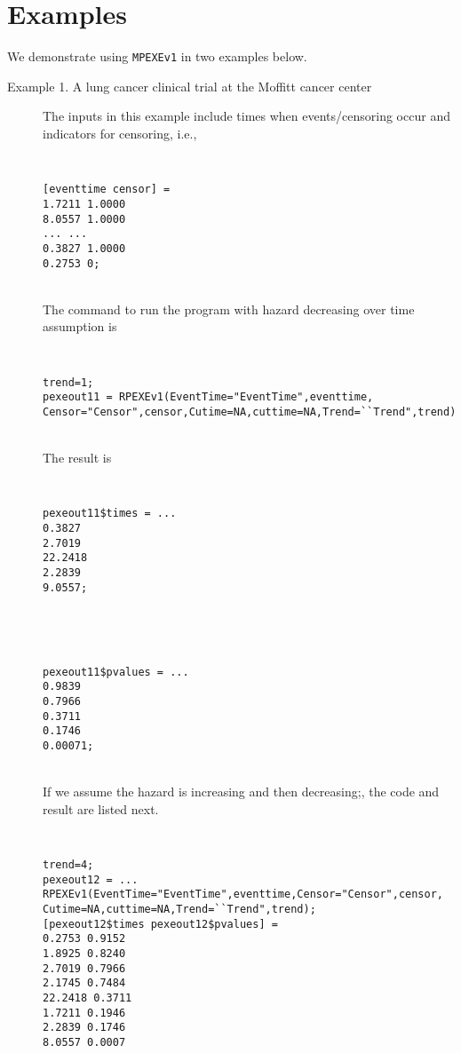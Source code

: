 \documentclass[12pt] {article}
\newenvironment{boxit}{\begin{lrbox}{\savepar}
\begin{minipage}[b]{5.5in}}
{\end{minipage}\end{lrbox}\fbox{\usebox{\savepar}}}
\begin{document}
\section{Examples}
We demonstrate using {\tt MPEXEv1} in two examples below.
\begin{description}
\item[Example 1. A lung cancer clinical trial at the Moffitt cancer center]
The inputs in this example include times when events/censoring occur and
indicators for censoring, i.e.,

\begin{boxit} {\tt
\noindent
\begin{verbatim}
[eventtime censor] =
1.7211 1.0000
8.0557 1.0000
... ...
0.3827 1.0000
0.2753 0;
\end{verbatim}}
\end{boxit} \\

The command to run the program with hazard decreasing over time assumption is

\begin{boxit} {\tt
\noindent
\begin{verbatim}
trend=1;
pexeout11 = RPEXEv1(EventTime="EventTime",eventtime,
Censor="Censor",censor,Cutime=NA,cuttime=NA,Trend=``Trend",trend);
\end{verbatim}}
\end{boxit} \\

The result is

\begin{boxit} {\tt
\noindent
\begin{verbatim}
pexeout11$times = ...
0.3827
2.7019
22.2418
2.2839
9.0557;
\end{verbatim}}
\end{boxit} \\

\begin{boxit} {\tt
\noindent
\begin{verbatim}
pexeout11$pvalues = ...
0.9839
0.7966
0.3711
0.1746
0.00071;
\end{verbatim}}
\end{boxit} \\

If we assume the hazard is increasing and then decreasing;,
the code and result are listed next.

\begin{boxit} {\tt
\noindent
\begin{verbatim}
trend=4;
pexeout12 = ...
RPEXEv1(EventTime="EventTime",eventtime,Censor="Censor",censor,
Cutime=NA,cuttime=NA,Trend=``Trend",trend);
[pexeout12$times pexeout12$pvalues] =
0.2753 0.9152
1.8925 0.8240
2.7019 0.7966
2.1745 0.7484
22.2418 0.3711
1.7211 0.1946
2.2839 0.1746
8.0557 0.0007
\end{verbatim}}
\end{boxit} \\

\end{description}
\end{document}
